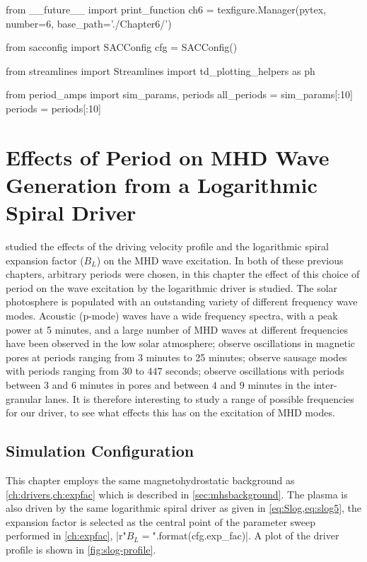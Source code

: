 \begin{pycode}[chapter6]
from __future__ import print_function
ch6 = texfigure.Manager(pytex, number=6, base_path='./Chapter6/')

from sacconfig import SACConfig
cfg = SACConfig()

from streamlines import Streamlines
import td_plotting_helpers as ph

from period_amps import sim_params, periods
all_periods = sim_params[:10]
periods = periods[:10]
\end{pycode}

\chapter{Effects of Period on MHD Wave Generation from a Logarithmic Spiral Driver}\label{ch:period}

 studied the effects of the driving velocity profile and the logarithmic spiral expansion factor ($B_L$) on the MHD wave excitation.
In both of these previous chapters, arbitrary periods were chosen, in this chapter the effect of this choice of period on the wave excitation by the logarithmic driver is studied.
The solar photosphere is populated with an outstanding variety of different frequency wave modes.
Acoustic (p-mode) waves have a wide frequency spectra, with a peak power at 5 minutes, and a large number of MHD waves at different frequencies have been observed in the low solar atmosphere; \cite{Freij2014,Dorotovic2014} observe oscillations in magnetic pores at periods ranging from 3 minutes to 25 minutes; \cite{morton2011} observe sausage modes with periods ranging from $30$ to $447$ seconds; \cite{fujimura2009} observe oscillations with periods between $3$ and $6$ minutes in pores and between $4$ and $9$ minutes in the inter-granular lanes.
It is therefore interesting to study a range of possible frequencies for our driver, to see what effects this has on the excitation of MHD modes.

\section{Simulation Configuration}\label{sec:periodconfig}
This chapter employs the same magnetohydrostatic background as \cref{ch:drivers,ch:expfac} which is described in \cref{sec:mhsbackground}.
The plasma is also driven by the same logarithmic spiral driver as given in \cref{eq:Slog,eq:slog5}, the expansion factor is selected as the central point of the parameter sweep performed in \cref{ch:expfac}, \py[chapter6]|r"$B_L={}$".format(cfg.exp_fac)|.
A plot of the driver profile is shown in \cref{fig:slog-profile}.

